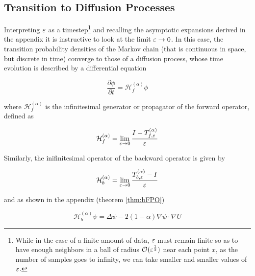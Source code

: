 \subsection{Transition to Diffusion Processes}
Interpreting $\varepsilon$ as a timestep\footnote{While in the case of a finite amount of data, $\varepsilon$ must remain finite so as to have enough neighbors in a ball of radius $\mathcal{O}(\varepsilon^\frac{1}{2})$ near each point $x$, as the number of samples goes to infinity, we can take smaller and smaller values of $\varepsilon$.} and recalling the asymptotic expansions derived in the appendix it is instructive to look at the limit $\varepsilon \rightarrow 0$. In this case, the transition probability densities of the Markov chain (that is continuous in space, but discrete in time) converge to those of a diffusion process, whose time evolution is described by a differential equation

\begin{equation*}
\frac{\partial \phi}{\partial t} = \mathcal{H}_f^{(\alpha)}\phi
\end{equation*}

where $\mathcal{H}_f^{(\alpha)}$ is the infinitesimal generator or propagator of the forward operator, defined as

\begin{definition}\begin{equation*}
\mathcal{H}_f^{(\alpha)}=\lim_{\varepsilon\rightarrow 0}\frac{I-T_{f,\varepsilon}^{(\alpha)}}{\varepsilon}
\end{equation*}\end{definition}

Similarly, the inifinitesimal operator of the backward operator is given by

\begin{definition}\begin{equation*}
\mathcal{H}_b^{(\alpha)}=\lim_{\varepsilon\rightarrow 0}\frac{T_{b,\varepsilon}^{(\alpha)}-I}{\varepsilon}
\end{equation*}\end{definition}

and as shown in the appendix (theorem \ref{thm:bFPO})

\begin{equation*}
\mathcal{H}_b^{(\alpha)}\psi = \Delta\psi - 2(1-\alpha)\nabla\psi\cdot\nabla U
\end{equation*}
